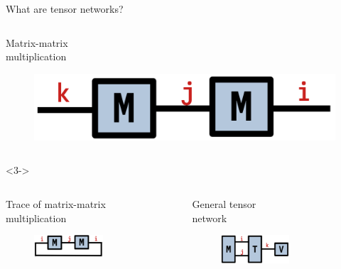 \begin{frame}[fragile]{What are tensor networks?}
\begin{onlyenv}
\begin{columns}
  \begin{column}[T]{0.33\textwidth}
    \centering
    Matrix-matrix\\
    multiplication
    \begin{figure}[T]
      \includegraphics[width=1.0\textwidth]{
        slides/assets/MM.png
      }
    \end{figure}
  \end{column}

\end{columns}

\end{onlyenv}

\vspace*{0.4cm}

\begin{onlyenv}<3->

\centering

\begin{columns}

  \begin{column}[T]{0.5\textwidth}
    \centering
    Trace of matrix-matrix\\
    multiplication
    \begin{figure}[T]
      \includegraphics[width=0.6\textwidth]{
        slides/assets/trMM.png
      }
    \end{figure}
  \end{column}

  \begin{column}[T]{0.5\textwidth}
    \centering
    General tensor\\
    network
    \begin{figure}[T]
      \includegraphics[width=0.6\textwidth]{
        slides/assets/MTV.png
      }
    \end{figure}
  \end{column}

\end{columns}

\end{onlyenv}

\end{frame}
